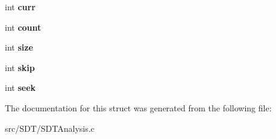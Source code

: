 \begin{DoxyCompactItemize}
\item 
\hypertarget{struct_s_d_t_pitch_a96010e8f175b18e5988b95a0cf09faa1}{}int {\bfseries curr}\label{struct_s_d_t_pitch_a96010e8f175b18e5988b95a0cf09faa1}

\item 
\hypertarget{struct_s_d_t_pitch_ad43c3812e6d13e0518d9f8b8f463ffcf}{}int {\bfseries count}\label{struct_s_d_t_pitch_ad43c3812e6d13e0518d9f8b8f463ffcf}

\item 
\hypertarget{struct_s_d_t_pitch_a439227feff9d7f55384e8780cfc2eb82}{}int {\bfseries size}\label{struct_s_d_t_pitch_a439227feff9d7f55384e8780cfc2eb82}

\item 
\hypertarget{struct_s_d_t_pitch_a13f77b252237844d7b8b6e3c3047fe50}{}int {\bfseries skip}\label{struct_s_d_t_pitch_a13f77b252237844d7b8b6e3c3047fe50}

\item 
\hypertarget{struct_s_d_t_pitch_ae9fff3db126e97d7628ae0cf472e47b7}{}int {\bfseries seek}\label{struct_s_d_t_pitch_ae9fff3db126e97d7628ae0cf472e47b7}

\end{DoxyCompactItemize}


The documentation for this struct was generated from the following file\+:\begin{DoxyCompactItemize}
\item 
src/\+S\+D\+T/S\+D\+T\+Analysis.\+c\end{DoxyCompactItemize}
